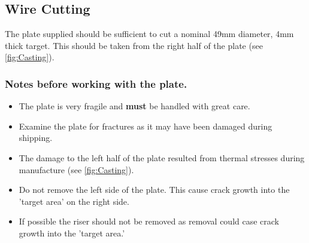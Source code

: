 \subsection{Wire Cutting}
The plate supplied should be sufficient to cut a nominal 49mm diameter, 4mm thick target. This should be taken from the right half of the plate (see \ref{fig:Casting}). 

\subsubsection{Notes before working with the plate.}
\begin{itemize}
\item The plate is very fragile and \textbf{must} be handled with great care. 
\item Examine the plate for fractures as it may have been damaged during shipping. 
\item The damage to the left half of the plate resulted from thermal stresses during manufacture (see \ref{fig:Casting}). 
\item Do not remove the left side of the plate. This cause crack growth into the 'target area' on the right side.
\item If possible the riser should not be removed as removal could case crack growth into the 'target area.'
\end{itemize}
